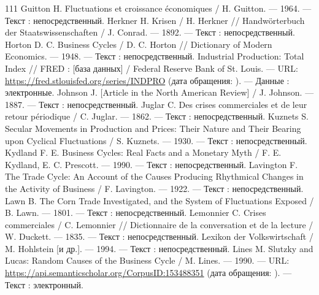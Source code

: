 \begin{RaggedRight}
\begin{thebibliography}{111}
     \hypertarget{bib:Guitton-1964}{} Guitton H. Fluctuations et croissance économiques / H. Guitton. --- 1964. --- Текст : непосредственный.
     \hypertarget{bib:Herkner-1892}{} Herkner H. Krisen / H. Herkner // Handwörterbuch der Staatswissenschaften / J. Conrad. --- 1892. --- Текст : непосредственный.
     \hypertarget{bib:Horton-1948}{} Horton D. C. Business Cycles / D. C. Horton // Dictionary of Modern Economics. --- 1948. --- Текст : непосредственный.
     \hypertarget{bib:FRED-INDPRO}{} Industrial Production: Total Index // FRED : [база данных] / Federal Reserve Bank of St. Louis. --- URL: \url{https://fred.stlouisfed.org/series/INDPRO} (дата обращения: \bibaccessdate). --- Данные : электронные.
     \hypertarget{bib:Johnson-1887}{} Johnson J. [Article in the North American Review] / J. Johnson. --- 1887. --- Текст : непосредственный.
     \hypertarget{bib:Juglar-1862}{} Juglar C. Des crises commerciales et de leur retour périodique / C. Juglar. --- 1862. --- Текст : непосредственный.
     \hypertarget{bib:Kuznets-1930}{} Kuznets S. Secular Movements in Production and Prices: Their Nature and Their Bearing upon Cyclical Fluctuations / S. Kuznets. --- 1930. --- Текст : непосредственный.
     \hypertarget{bib:Kydland-1990}{} Kydland F. E. Business Cycles: Real Facts and a Monetary Myth / F. E. Kydland, E. C. Prescott. --- 1990. --- Текст : непосредственный.
     \hypertarget{bib:Lavington-1922}{} Lavington F. The Trade Cycle: An Account of the Causes Producing Rhythmical Changes in the Activity of Business / F. Lavington. --- 1922. --- Текст : непосредственный.
     \hypertarget{bib:Lawn-1801}{} Lawn B. The Corn Trade Investigated, and the System of Fluctuations Exposed / B. Lawn. --- 1801. --- Текст : непосредственный.
     \hypertarget{bib:Lemonnier-1835}{} Lemonnier C. Crises commerciales / C. Lemonnier // Dictionnaire de la conversation et de la lecture / W. Duckett. --- 1835. --- Текст : непосредственный.
     \hypertarget{bib:Hohlstein-1994}{} Lexikon der Volkswirtschaft / M. Hohlstein [и др.]. --- 1994. --- Текст : непосредственный.
     \hypertarget{bib:Lines-1990}{} Lines M. Slutzky and Lucas: Random Causes of the Business Cycle / M. Lines. --- 1990. --- URL: \url{https://api.semanticscholar.org/CorpusID:153488351} (дата обращения: \bibaccessdate). --- Текст : электронный.

\end{thebibliography}
\end{RaggedRight}
